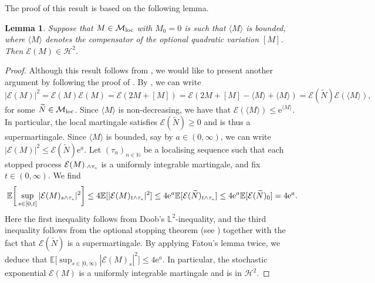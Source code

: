 \documentclass[10pt]{article} %
\newtheorem{lemma}[theorem]{Lemma}
\newcommand\cE{\mathcal E}
\newcommand\cH{\mathcal H}
\newcommand\cM{\mathcal M}
\newcommand{\smalltext}[1]{\text{\fontsize{4}{4}\selectfont$#1$}}
\def \E{\mathbb{E}}
\def \L{\mathbb{L}}
\def \N{\mathbb{N}}
\newcommand{\1}{\mathbf{1}}
\begin{document}
The proof of this result is based on the following lemma.

\begin{lemma}\label{lem::stoch_exp}
	Suppose that $M \in \cM_\text{\rm loc}$ with $M_0 = 0$ is such that $\langle M \rangle$ is bounded, where $\langle M \rangle$ denotes the compensator of the optional quadratic variation $[M]$. Then $\cE(M) \in \cH^2$.
\end{lemma}

\begin{proof}
	Although this result follows from \cite[Proposition 8.27]{jacod1979calcul}, we would like to present another argument by following the proof of \cite[Th\'eor\`eme II.3]{lepingle1978sur}. By \cite[Proposition II.1]{lepingle1978sur2}, we can write
	\begin{equation*}
		|\cE(M)|^2 = \cE(M)\cE(M) = \cE(2M + [M]) = \cE(2M + [M] - \langle M \rangle + \langle M \rangle) = \cE(\widetilde N) \cE(\langle M \rangle),
	\end{equation*}
	for some $\widetilde N \in \cM_\text{\rm loc}$. Since $\langle M \rangle$ is non-decreasing, we have that $\cE(\langle M \rangle) \leq \mathrm{e}^{\langle M \rangle}$. In particular, the local martingale satisfies $\cE(\widetilde N) \geq 0$ and is thus a supermartingale. Since $\langle M \rangle$ is bounded, say by $a \in (0,\infty)$, we can write $|\cE(M)|^2 \leq \cE(\widetilde N) \mathrm{e}^a$. Let $(\tau_n)_{n \in \N}$ be a localising sequence such that each stopped process $\cE(M)_{\cdot \land \tau_\smalltext{n}}$ is a uniformly integrable martingale, and fix $t \in (0,\infty)$. We find
	\begin{equation*}
		\E\bigg[\sup_{s \in [0,t]} |\cE(M)_{s \land \tau_\smalltext{n}}|^2\bigg] \leq 4 \E[|\cE(M)_{t \land \tau_\smalltext{n}}|^2] \leq 4 \mathrm{e}^a \E[\cE(\widetilde N)_{t \land \tau_\smalltext{n}}] \leq 4 \mathrm{e}^a\E[\cE(\widetilde N)_0] = 4 \mathrm{e}^a.
	\end{equation*}
	Here the first inequality follows from Doob's $\L^2$-inequality, and the third inequality follows from the optional stopping theorem (see \cite[Theorem 3.2.7]{weizsaecker1990stochastic}) together with the fact that $\cE(\widetilde N)$ is a supermartingale. By applying Fatou's lemma twice, we deduce that $\E\big[\sup_{s \in [0,\infty)} |\cE(M)_s|^2\big] \leq 4 \mathrm{e}^a.$ In particular, the stochastic exponential $\cE(M)$ is a uniformly integrable martingale and is in $\cH^2$. 
	\end{proof}
\end{document}
